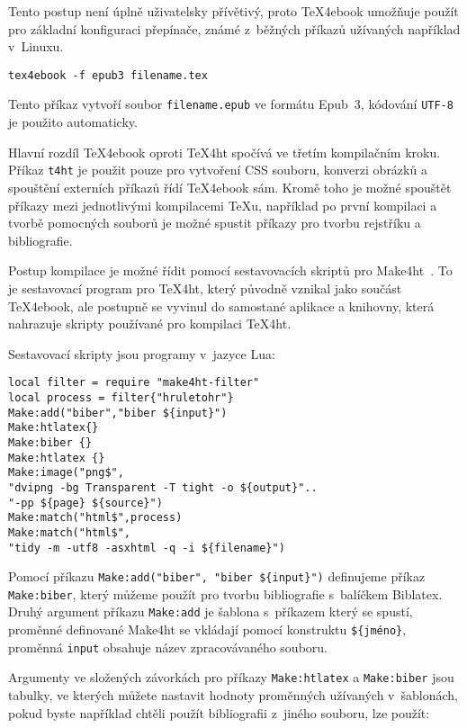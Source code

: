 \documentclass{csbulletin}
\begin{document}
Tento postup není úplně uživatelsky přívětivý, proto TeX4ebook umožňuje
použít pro základní konfiguraci přepínače, známé z~běžných příkazů užívaných
například v~Linuxu.

\begin{verbatim}
tex4ebook -f epub3 filename.tex
\end{verbatim}

Tento příkaz vytvoří soubor \texttt{filename.epub} ve formátu Epub~3, kódování
\texttt{UTF-8} je použito automaticky. 

Hlavní rozdíl TeX4ebook oproti TeX4ht spočívá ve třetím kompilačním kroku.
Příkaz \texttt{t4ht} je použit pouze pro vytvoření CSS souboru, konverzi
obrázků a spouštění externích příkazů řídí TeX4ebook sám. Kromě toho je možné
spouštět příkazy mezi jednotlivými kompilacemi \TeX u, například po první
kompilaci a tvorbě pomocných souborů je možné spustit příkazy pro tvorbu
rejstříku a bibliografie. 

Postup kompilace je možné řídit pomocí sestavovacích skriptů pro
Make4ht~\cite{bib:make4ht}. To je sestavovací program
pro TeX4ht, který původně vznikal jako součást TeX4ebook, ale postupně se
vyvinul do samostané aplikace a knihovny, která nahrazuje skripty používané pro
kompilaci TeX4ht.

Sestavovací skripty jsou programy v~jazyce Lua:

\begin{verbatim}
local filter = require "make4ht-filter"
local process = filter{"hruletohr"}
Make:add("biber","biber ${input}")
Make:htlatex{}
Make:biber {}
Make:htlatex {}
Make:image("png$",                                                          
"dvipng -bg Transparent -T tight -o ${output}"..
"-pp ${page} ${source}")
Make:match("html$",process)
Make:match("html$",
"tidy -m -utf8 -asxhtml -q -i ${filename}")
\end{verbatim}


Pomocí příkazu \verb|Make:add("biber", "biber ${input}")| definujeme příkaz
\verb|Make:biber|, který můžeme použít  pro tvorbu bibliografie s~balíčkem
Biblatex. Druhý argument příkazu \verb|Make:add| je šablona s~příkazem který se
spustí, proměnné definované Make4ht se vkládají pomocí konstruktu
\verb|${jméno}|, proměnná \texttt{input} obsahuje název zpracovávaného souboru.

Argumenty ve složených závorkách pro příkazy \texttt{Make:htlatex} a
\texttt{Make:biber} jsou tabulky, ve kterých můžete nastavit hodnoty
proměnných užívaných v~šablonách, pokud byste například chtěli použít
bibliografii z~jiného souboru, lze použít:
\end{document}
